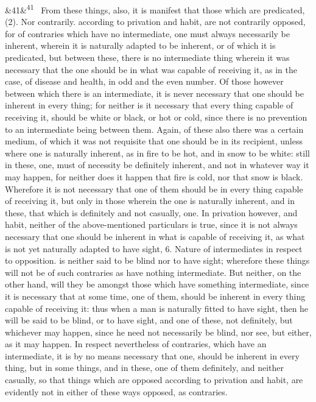 \documentclass[12pt]{article}
\newcommand{\para}[1][]{\par\noindent\ifx&#1&\else\textsuperscript{\footnotesize #1}~\fi}
\begin{document}
\para[41] From these things, also, it is manifest that those which are predicated, (2). Nor contrarily. according to privation and habit, are not contrarily opposed, for of contraries which have no intermediate, one must always necessarily be inherent, wherein it is naturally adapted to be inherent, or of which it is predicated, but between these, there is no intermediate thing wherein it was necessary that the one should be in what was capable of receiving it, as in the case, of disease and health, in odd and the even number. Of those however between which there is an intermediate, it is never necessary that one should be inherent in every thing; for neither is it necessary that every thing capable of receiving it, should be white or black, or hot or cold, since there is no prevention to an intermediate being between them. Again, of these also there was a certain medium, of which it was not requisite that one should be in its recipient, unless where one is naturally inherent, as in fire to be hot, and in snow to be white: still in these, one, must of necessity be definitely inherent, and not in whatever way it may happen, for neither does it happen that fire is cold, nor that snow is black. Wherefore it is not necessary that one of them should be in every thing capable of receiving it, but only in those wherein the one is naturally inherent, and in these, that which is definitely and not casually, one. In privation however, and habit, neither of the above-mentioned particulars is true, since it is not always necessary that one should be inherent in what is capable of receiving it, as what is not yet naturally adapted to have sight, 6. Nature of intermediates in respect to opposition. is neither said to be blind nor to have sight; wherefore these things will not be of such contraries as have nothing intermediate. But neither, on the other hand, will they be amongst those which have something intermediate, since it is necessary that at some time, one of them, should be inherent in every thing capable of receiving it: thus when a man is naturally fitted to have sight, then he will be said to be blind, or to have sight, and one of these, not definitely, but whichever may happen, since he need not necessarily be blind, nor see, but either, as it may happen. In respect nevertheless of contraries, which have an intermediate, it is by no means necessary that one, should be inherent in every thing, but in some things, and in these, one of them definitely, and neither casually, so that things which are opposed according to privation and habit, are evidently not in either of these ways opposed, as contraries.
\end{document}
